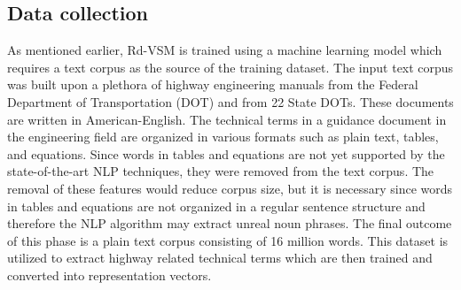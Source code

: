 \documentclass[Journal,InsideFigs, DoubleSpace]{ascelike} %
\begin{document}
\subsection{Data collection}
As mentioned earlier, Rd-VSM is trained using a machine learning model which requires a text corpus as the source of the training dataset. The input text corpus was built upon a plethora of highway engineering manuals from the Federal Department of Transportation (DOT) and from 22 State DOTs. These documents are written in American-English. The technical terms in a guidance document in the engineering field are organized in various formats such as plain text, tables, and equations. Since words in tables and equations are not yet supported by the state-of-the-art NLP techniques, they were removed from the text corpus. The removal of these features would reduce corpus size, but it is necessary since words in tables and equations are not organized in a regular sentence structure and therefore the NLP algorithm may extract unreal noun phrases. The final outcome of this phase is a plain text corpus consisting of 16 million words. This dataset is utilized to extract highway related technical terms which are then trained and converted into representation vectors.
%
\end{document}
